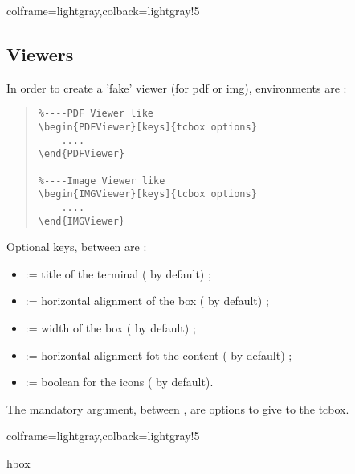 \documentclass[11pt,a4paper]{ltxdoc}
\begin{document}
\begin{tcblisting}{colframe=lightgray,colback=lightgray!5}
\end{tcblisting}

\pagebreak

\subsection{Viewers}

In order to create a 'fake' viewer (for \textsf{pdf} or \textsf{img}), environments are :

\begin{quote}
\begin{verbatim}
%----PDF Viewer like
\begin{PDFViewer}[keys]{tcbox options}
    ....
\end{PDFViewer}

%----Image Viewer like
\begin{IMGViewer}[keys]{tcbox options}
    ....
\end{IMGViewer}
\end{verbatim}
\end{quote}

Optional keys, between \MontreCode{[...]} are :

\begin{itemize}
	\item {} := title of the terminal ( by default) ;
	\item {} := horizontal alignment of the box ( by default) ;
	\item {} := width of the box ( by default) ;
	\item {} := horizontal alignment fot the content ( by default) ;
	\item {} := boolean for the icons ( by default).
\end{itemize}

\medskip

The mandatory argument, between , are options to give to the tcbox.

\begin{tcblisting}{colframe=lightgray,colback=lightgray!5}
\begin{PDFViewer}{hbox}
%
\end{PDFViewer}
\end{tcblisting}
\end{document}
